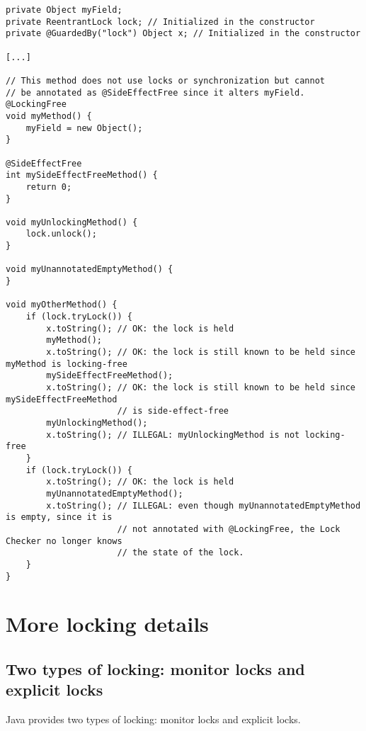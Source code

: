 \begin{verbatim}
private Object myField;
private ReentrantLock lock; // Initialized in the constructor
private @GuardedBy("lock") Object x; // Initialized in the constructor

[...]

// This method does not use locks or synchronization but cannot
// be annotated as @SideEffectFree since it alters myField.
@LockingFree
void myMethod() {
    myField = new Object();
}

@SideEffectFree
int mySideEffectFreeMethod() {
    return 0;
}

void myUnlockingMethod() {
    lock.unlock();
}

void myUnannotatedEmptyMethod() {
}

void myOtherMethod() {
    if (lock.tryLock()) {
        x.toString(); // OK: the lock is held
        myMethod();
        x.toString(); // OK: the lock is still known to be held since myMethod is locking-free
        mySideEffectFreeMethod();
        x.toString(); // OK: the lock is still known to be held since mySideEffectFreeMethod
                      // is side-effect-free
        myUnlockingMethod();
        x.toString(); // ILLEGAL: myUnlockingMethod is not locking-free
    }
    if (lock.tryLock()) {
        x.toString(); // OK: the lock is held
        myUnannotatedEmptyMethod();
        x.toString(); // ILLEGAL: even though myUnannotatedEmptyMethod is empty, since it is
                      // not annotated with @LockingFree, the Lock Checker no longer knows
                      // the state of the lock.
    }
}
\end{verbatim}




\section{More locking details\label{lock-details}}

\subsection{Two types of locking:  monitor locks and explicit locks\label{lock-two-types}}

Java provides two types of locking:  monitor locks and explicit locks.

